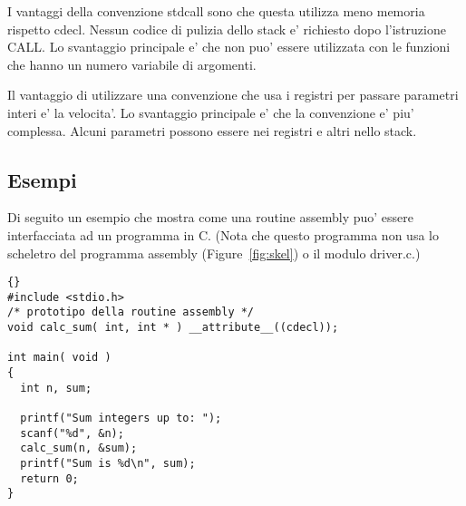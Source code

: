 I vantaggi della convenzione {\code stdcall}
sono che questa utilizza meno memoria rispetto {\code cdecl}. Nessun
codice di pulizia dello stack e' richiesto dopo l'istruzione {\code CALL}.
Lo svantaggio principale e' che non puo' essere utilizzata con le
funzioni che hanno un numero variabile di argomenti.

Il vantaggio di utilizzare una convenzione che usa i registri per
passare parametri interi e' la velocita'. Lo svantaggio principale e' che
la convenzione e' piu' complessa. Alcuni parametri possono essere nei
registri e altri nello stack.


\subsection{Esempi}

Di seguito un esempio che mostra come una routine assembly puo' essere
interfacciata ad un programma in C. (Nota che questo programma non usa
lo scheletro del programma assembly (Figure~\ref{fig:skel}) o il modulo
driver.c.)

\begin{lstlisting}{}
#include <stdio.h>
/* prototipo della routine assembly */
void calc_sum( int, int * ) __attribute__((cdecl));

int main( void )
{
  int n, sum;

  printf("Sum integers up to: ");
  scanf("%d", &n);
  calc_sum(n, &sum);
  printf("Sum is %d\n", sum);
  return 0;
}
\end{lstlisting}

